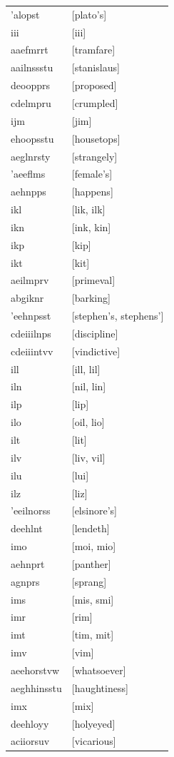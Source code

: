 \documentclass{article}
\begin{document}
\begin{tabular}{ll}
'alopst & [plato's] \\
iii & [iii] \\
aaefmrrt & [tramfare] \\
aailnssstu & [stanislaus] \\
deoopprs & [proposed] \\
cdelmpru & [crumpled] \\
ijm & [jim] \\
ehoopsstu & [housetops] \\
aeglnrsty & [strangely] \\
'aeeflms & [female's] \\
aehnpps & [happens] \\
ikl & [lik, ilk] \\
ikn & [ink, kin] \\
ikp & [kip] \\
ikt & [kit] \\
aeilmprv & [primeval] \\
abgiknr & [barking] \\
'eehnpsst & [stephen's, stephens'] \\
cdeiiilnps & [discipline] \\
cdeiiintvv & [vindictive] \\
ill & [ill, lil] \\
iln & [nil, lin] \\
ilp & [lip] \\
ilo & [oil, lio] \\
ilt & [lit] \\
ilv & [liv, vil] \\
ilu & [lui] \\
ilz & [liz] \\
'eeilnorss & [elsinore's] \\
deehlnt & [lendeth] \\
imo & [moi, mio] \\
aehnprt & [panther] \\
agnprs & [sprang] \\
ims & [mis, smi] \\
imr & [rim] \\
imt & [tim, mit] \\
imv & [vim] \\
aeehorstvw & [whatsoever] \\
aeghhinsstu & [haughtiness] \\
imx & [mix] \\
deehloyy & [holyeyed] \\
aciiorsuv & [vicarious] \\

\end{tabular}
\end{document}
